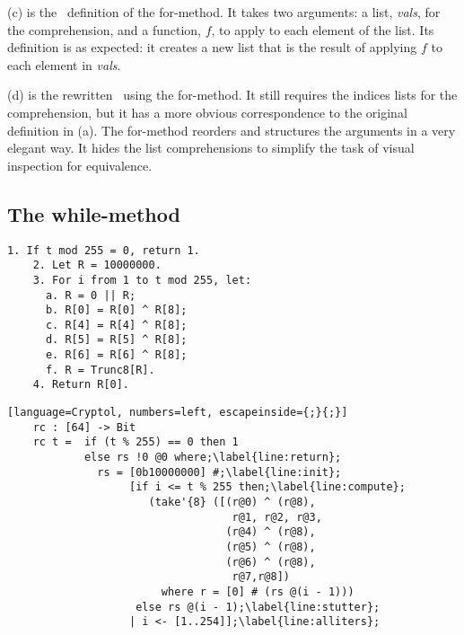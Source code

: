 (c) is the \cryptol\ definition of the for-method.
It takes two arguments: a list, \emph{vals}, for the comprehension, and a function, $f$, to apply to each element of the list.
Its definition is as expected: it creates a new list that is the result of applying $f$ to each element in \emph{vals}.

(d) is the rewritten \cryptol\ using the for-method.
It still requires the indices lists for the comprehension, but it has a more obvious correspondence to the original definition in (a).
The for-method reorders and structures the arguments in a very elegant way.
It hides the list comprehensions to simplify the task of visual inspection for equivalence.

\subsection{The while-method}

\newsavebox{\fipsRc}
\begin{lrbox}{\fipsRc}
  \begin{lstlisting}[basewidth = {.5em},basicstyle={\small}]
    1. If t mod 255 = 0, return 1.
    2. Let R = 10000000.
    3. For i from 1 to t mod 255, let:
      a. R = 0 || R;
      b. R[0] = R[0] ^ R[8];
      c. R[4] = R[4] ^ R[8];
      d. R[5] = R[5] ^ R[8];
      e. R[6] = R[6] ^ R[8];
      f. R = Trunc8[R].
    4. Return R[0].
  \end{lstlisting}
\end{lrbox}

\newsavebox{\RcCry}
\begin{lrbox}{\RcCry}
  \begin{lstlisting}[language=Cryptol, numbers=left, escapeinside={;}{;}]
    rc : [64] -> Bit
    rc t =  if (t % 255) == 0 then 1
            else rs !0 @0 where;\label{line:return};
              rs = [0b10000000] #;\label{line:init};
                   [if i <= t % 255 then;\label{line:compute};
                      (take'{8} ([(r@0) ^ (r@8),
                                   r@1, r@2, r@3, 
                                  (r@4) ^ (r@8),
                                  (r@5) ^ (r@8),
                                  (r@6) ^ (r@8),
                                   r@7,r@8])
                        where r = [0] # (rs @(i - 1)))
                    else rs @(i - 1);\label{line:stutter};
                   | i <- [1..254]];\label{line:alliters};
  \end{lstlisting}
\end{lrbox}

